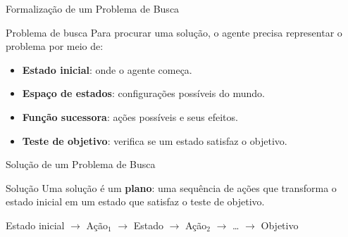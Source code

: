 \documentclass[xcolor=dvipsnames,table]{beamer}
\begin{document}
\begin{frame}{Formalização de um Problema de Busca}
\begin{block}{Problema de busca}
Para procurar uma solução, o agente precisa representar o problema por meio de:
\end{block}

\begin{itemize}
    \item {\color{blue}\bf Estado inicial}: onde o agente começa.
    \item {\color{blue}\bf Espaço de estados}: configurações possíveis do mundo.
    \item {\color{blue}\bf Função sucessora}: ações possíveis e seus efeitos.
    \item {\color{blue}\bf Teste de objetivo}: verifica se um estado satisfaz o objetivo.
\end{itemize}

\end{frame}

\begin{frame}{Solução de um Problema de Busca}
\begin{block}{Solução}
Uma solução é um {\color{blue}\bf plano}: uma sequência de ações que transforma o estado inicial em um estado que satisfaz o teste de objetivo.
\end{block}\pause

\begin{center}
    Estado inicial
    $\longrightarrow$
    Ação$_1$
    $\longrightarrow$
    Estado
    $\longrightarrow$
    Ação$_2$
    $\longrightarrow$
    \ldots
    $\longrightarrow$
    Objetivo
\end{center}

\end{frame}
\end{document}

